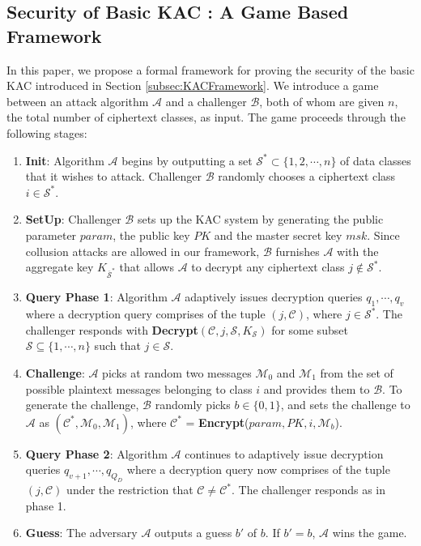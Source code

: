\subsection{Security of Basic KAC : A Game Based Framework}
\label{subsec:gamebasic}

In this paper, we propose a formal framework for proving the security of the basic KAC introduced in Section \ref{subsec:KACFramework}. We introduce a game between an attack algorithm $\mathcal{A}$ and a challenger $\mathcal{B}$, both of whom are given $n$, the total number of ciphertext classes, as input. The game proceeds through the following stages:

\begin{enumerate}
 \item \textbf{Init}: Algorithm $\mathcal{A}$ begins by outputting a set ${\mathcal{S}}^{*} \subset \{1,2,\cdots,n\}$ of data classes that it wishes to attack. Challenger $\mathcal{B}$ randomly chooses a ciphertext class $i\in{\mathcal{S}}^{*}$.
 
 \item \textbf{SetUp}: Challenger $\mathcal{B}$ sets up the KAC system by generating the public parameter $param$, the public key $PK$ and the master secret key $msk$. Since collusion attacks are allowed in our framework, $\mathcal{B}$ furnishes $\mathcal{A}$ with the aggregate key $K_{\overline{\mathcal{S}}^{*}}$ that allows $\mathcal{A}$ to decrypt any ciphertext class $j\notin{\mathcal{S}}^{*}$. 
 
 \item \textbf{Query Phase 1}: Algorithm $\mathcal{A}$ adaptively issues decryption queries $q_1,\cdots,q_v$ where a decryption query comprises of the tuple $(j,\mathcal{C})$, where $j\in{\mathcal{S}}^{*}$. The challenger responds with \textbf{Decrypt}$(\mathcal{C},j,\mathcal{S},K_{\mathcal{S}})$ for some subset $\mathcal{S}\subseteq\{1,\cdots,n\}$ such that $j\in\mathcal{S}$. 
 
 \item \textbf{Challenge}: $\mathcal{A}$ picks at random two messages $\mathcal{M}_0$ and $\mathcal{M}_1$ from the set of possible plaintext messages belonging to class $i$ and provides them to $\mathcal{B}$. To generate the challenge, $\mathcal{B}$ randomly picks $b\in\{0,1\}$, and sets the challenge to $\mathcal{A}$ as $(\mathcal{C}^{*},\mathcal{M}_0,\mathcal{M}_1)$, where ${\mathcal{C}}^{*}$ = \textbf{Encrypt}($param,PK,i,\mathcal{M}_b$).
 
 \item \textbf{Query Phase 2}: Algorithm $\mathcal{A}$ continues to adaptively issue decryption queries $q_{v+1},\cdots,q_{Q_D}$ where a decryption query now comprises of the tuple $(j,\mathcal{C})$ under the restriction that $\mathcal{C}\neq {\mathcal{C}}^{*}$. The challenger responds as in phase 1. 
 
 
 \item\textbf{Guess}: The adversary $\mathcal{A}$ outputs a guess $b'$ of $b$. If $b' = b$, $\mathcal{A}$ wins the game.
\end{enumerate}

